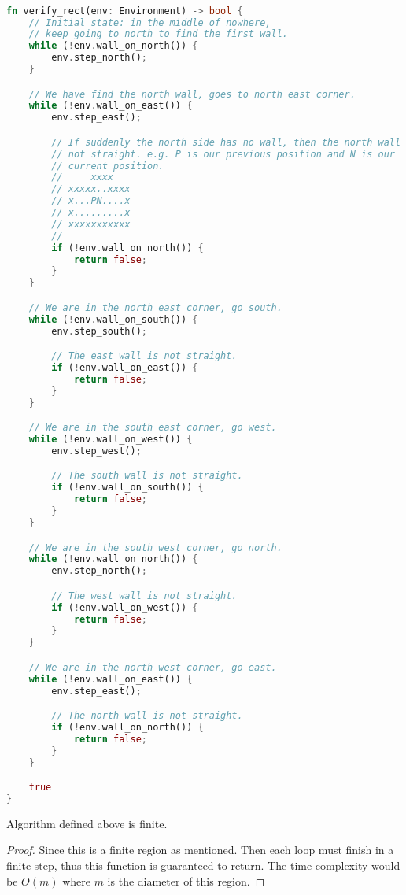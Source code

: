 \begin{lstlisting}[language=Rust, style=boxed]

fn verify_rect(env: Environment) -> bool {
    // Initial state: in the middle of nowhere, 
    // keep going to north to find the first wall.
    while (!env.wall_on_north()) {
        env.step_north();
    }

    // We have find the north wall, goes to north east corner.
    while (!env.wall_on_east()) {
        env.step_east();

        // If suddenly the north side has no wall, then the north wall is  
        // not straight. e.g. P is our previous position and N is our 
        // current position.
        //     xxxx
        // xxxxx..xxxx
        // x...PN....x
        // x.........x
        // xxxxxxxxxxx
        //
        if (!env.wall_on_north()) {
            return false;
        }
    }

    // We are in the north east corner, go south.
    while (!env.wall_on_south()) {
        env.step_south();

        // The east wall is not straight.
        if (!env.wall_on_east()) {
            return false;
        }
    }

    // We are in the south east corner, go west.
    while (!env.wall_on_west()) {
        env.step_west();

        // The south wall is not straight.
        if (!env.wall_on_south()) {
            return false;
        }
    }

    // We are in the south west corner, go north.
    while (!env.wall_on_north()) {
        env.step_north();

        // The west wall is not straight.
        if (!env.wall_on_west()) {
            return false;
        }
    }

    // We are in the north west corner, go east.
    while (!env.wall_on_east()) {
        env.step_east();

        // The north wall is not straight.
        if (!env.wall_on_north()) {
            return false;
        }
    }

    true
}
\end{lstlisting}

\begin{theorem}
    Algorithm defined above is finite.
\end{theorem}

\begin{proof}
    Since this is a finite region as mentioned. 
    Then each loop must finish in a finite step, thus this function is guaranteed to return.
    The time complexity would be $O(m)$ where $m$ is the diameter of this region.
\end{proof}

    

    
    
    

